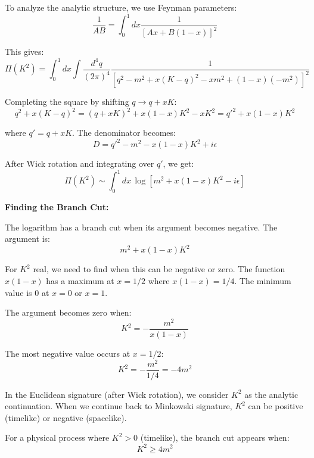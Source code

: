 \documentclass[12pt]{article}
\begin{document}
To analyze the analytic structure, we use Feynman parameters:
\begin{equation}
\frac{1}{AB} = \int_0^1 dx \frac{1}{[Ax + B(1-x)]^2}
\end{equation}

This gives:
\begin{equation}
\Pi(K^2) = \int_0^1 dx \int \frac{d^4q}{(2\pi)^4} \frac{1}{[q^2 - m^2 + x(K-q)^2 - xm^2 + (1-x)(-m^2)]^2}
\end{equation}

Completing the square by shifting $q \to q + xK$:
\begin{equation}
q^2 + x(K-q)^2 = (q + xK)^2 + x(1-x)K^2 - xK^2 = q'^2 + x(1-x)K^2
\end{equation}

where $q' = q + xK$. The denominator becomes:
\begin{equation}
D = q'^2 - m^2 - x(1-x)K^2 + i\epsilon
\end{equation}

After Wick rotation and integrating over $q'$, we get:
\begin{equation}
\Pi(K^2) \sim \int_0^1 dx \, \log[m^2 + x(1-x)K^2 - i\epsilon]
\end{equation}

\textbf{Finding the Branch Cut:}

The logarithm has a branch cut when its argument becomes negative. The argument is:
\begin{equation}
m^2 + x(1-x)K^2
\end{equation}

For $K^2$ real, we need to find when this can be negative or zero. The function $x(1-x)$ has a maximum at $x = 1/2$ where $x(1-x) = 1/4$. The minimum value is $0$ at $x = 0$ or $x = 1$.

The argument becomes zero when:
\begin{equation}
K^2 = -\frac{m^2}{x(1-x)}
\end{equation}

The most negative value occurs at $x = 1/2$:
\begin{equation}
K^2 = -\frac{m^2}{1/4} = -4m^2
\end{equation}

In the Euclidean signature (after Wick rotation), we consider $K^2$ as the analytic continuation. When we continue back to Minkowski signature, $K^2$ can be positive (timelike) or negative (spacelike).

For a physical process where $K^2 > 0$ (timelike), the branch cut appears when:
\begin{equation}
K^2 \geq 4m^2
\end{equation}
\end{document}
